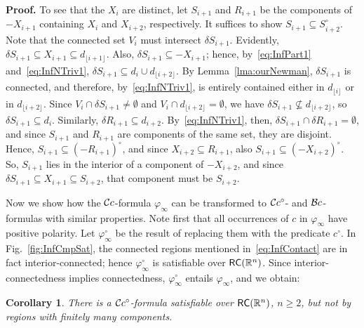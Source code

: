 \documentclass{article}
\newtheorem{corollary}[theorem]{Corollary}
\newcommand{\ic}{c^\circ}
\newcommand{\R}{\mathbb{R}}
\newcommand{\RC}{{\sf RC}}
\newcommand{\ti}[2][]{{#2}^{\circ_{#1}}}
\newcommand{\md}[2][] {{\lfloor#2\rfloor_{#1}}}
\newcommand{\qedsymbol}{\ding{113}}
\newenvironment{proof}{\par\noindent\textbf{Proof.}}{\mbox{}\hfill\qedsymbol\par\bigskip}
\renewcommand{\phi}{\varphi}
\begin{document}
\begin{proof}
To see that the $X_i$ are distinct, let $S_{i+1}$ and $R_{i+1}$ be the
components of $-X_{i+1}$ containing $X_i$ and $X_{i+2}$,
respectively. It suffices to show $S_{i+1} \subseteq\ti{S}_{i+2}$.
Note that the connected set $V_i$ must intersect $\delta S_{i+1}$.
Evidently, $\delta S_{i+1} \subseteq X_{i+1} \subseteq d_{\md{i+1}}$.
Also, $\delta S_{i+1} \subseteq -X_{i+1}$; hence,
by~\eqref{eq:InfPart1} and~\eqref{eq:InfNTriv1}, $\delta S_{i+1}
\subseteq d_{i} \cup d_{\md{i+2}}$.  By Lemma~\ref{lma:ourNewman},
$\delta S_{i+1}$ is connected, and therefore, by~\eqref{eq:InfNTriv1},
is entirely contained either in $d_{\md{i}}$ or in
$d_{\md{i+2}}$. Since $V_i \cap \delta S_{i+1} \neq \emptyset$ and
$V_i \cap d_{\md{i+2}} = \emptyset$, we have $\delta S_{i+1} \not
\subseteq d_{\md{i+2}}$, so $\delta S_{i+1} \subseteq d_i$. Similarly,
$\delta R_{i+1}\subseteq d_{i+2}$.  By~\eqref{eq:InfNTriv1}, then,
$\delta S_{i+1} \cap \delta R_{i+1} = \emptyset$, and since $S_{i+1}$
and $R_{i+1}$ are components of the same set, they are
disjoint. Hence, $S_{i+1}\subseteq \ti{(-R_{i+1})}$, and since
$X_{i+2}\subseteq R_{i+1}$, also $S_{i+1}\subseteq
\ti{(-X_{i+2})}$. So, $S_{i+1}$ lies in the interior of
a component of $-X_{i+2}$, and since $\delta S_{i+1}\subseteq
X_{i+1}\subseteq S_{i+2}$, that component must be $S_{i+2}$.
\end{proof}

\vspace*{-2mm}

Now we show how the $\mathcal{C}c$-formula $\phi_\infty$ can be transformed
to $\mathcal{C}c^\circ$- and $\mathcal{B}c$-formulas with similar properties.  Note first
that all occurrences of $c$ in $\phi_\infty$ have positive polarity.
Let $\ti{\phi}_\infty$ be the result of replacing them with the
predicate $\ic$. In Fig.~\ref{fig:InfCmpSat}, the connected regions
mentioned in~\eqref{eq:InfContact} are in fact interior-connected;
hence $\ti{\phi}_\infty$ is satisfiable over $\RC(\R^n)$. Since
interior-connectedness implies connectedness, $\ti{\phi}_\infty$
entails $\phi_\infty$, and we obtain:
\begin{corollary}\label{cor:inftyCci}
There is a $\mathcal{C}c^\circ$-formula 
satisfiable over $\RC(\R^n)$, $n
\geq 2$, but not by regions with finitely many components.
\end{corollary}
\end{document}
